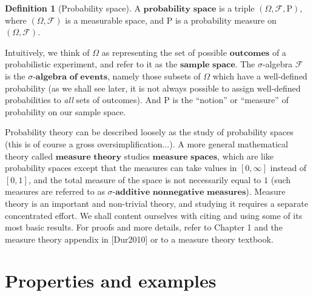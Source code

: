 \documentclass[11pt]{report}
\providecommand{\cal}{\mathcal}
\theoremstyle{plain}
\theoremstyle{definition}
\newtheorem{defn}[thm]{Definition}
\begin{document}
\begin{defn}[Probability space]
A $\textbf{probability space}$ is a triple
$(\Omega, {\cal F}, \mathrm{P})$, where
$(\Omega, {\cal F})$ is a measurable space, and
$\mathrm{P}$ is a probability measure on
$(\Omega, {\cal F})$.
\end{defn}

Intuitively, we think of $\Omega$ as representing the
set of possible $\textbf{outcomes}$ of a
probabilistic experiment, and refer to it as the
$\textbf{sample space}$. The $\sigma$-algebra
${\cal F}$ is the $\textbf{$\sigma
$-algebra of events}$, namely those subsets of
$\Omega$ which have a well-defined probability (as we
shall see later, it is not always possible to assign
well-defined probabilities to \emph{all} sets of outcomes).
And $\mathrm{P}$ is the ``notion'' or ``measure'' of
probability on our sample space.

Probability theory can be described loosely as the
study of probability spaces (this is of course a gross
oversimplification...). A more general mathematical
theory called $\textbf{measure theory}$ studies
$\textbf{measure spaces}$, which are like probability
spaces except that the measures can take values in
$[0,\infty]$ instead of $[0,1]$, and the total
measure of the space is not necessarily equal to $1$
(such measures are referred to as $\textbf{$\sigma
$-additive nonnegative measures}$). Measure theory is
an important and non-trivial theory, and studying it
requires a separate concentrated effort. We shall
content ourselves with citing and using some of its
most basic results. For proofs and more details, refer
to Chapter 1 and the measure theory appendix in
[Dur2010] or to a measure theory textbook.

\section{Properties and examples}
\end{document}
